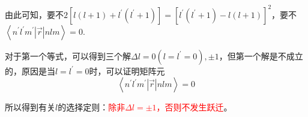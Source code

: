 \documentclass[UTF8]{ctexart}
\newcommand{\red}{\textcolor{red}}
\begin{document}
\noindent 由此可知，要不$2\left[l(l+1)+l^{\prime}\left(l^{\prime}+1\right)\right]=\left[l^{\prime}\left(l^{\prime}+1\right)-l(l+1)\right]^{2}$，要不$\left\langle n^{\prime} l^{\prime} m^{\prime}|\vec{r}| n l m\right\rangle = 0$.

    对于第一个等式，可以得到三个解$\Delta l=0(l=l^{\prime}=0),\pm1$，但第一个解是不成立的，原因是当$l = l^{\prime} = 0$时，可以证明矩阵元
    \begin{equation}
        \left\langle n^{\prime} l^{\prime} m^{\prime}|\vec{r}| n l m\right\rangle = 0
    \end{equation}

\noindent 所以得到有关$l$的选择定则：\red{除非$\Delta l = \pm 1$，否则不发生跃迁}。
\end{document}
